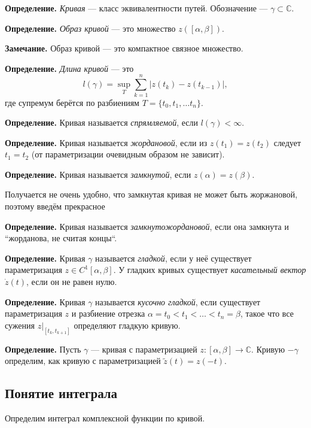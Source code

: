 \textbf{Определение.} \textit{Кривая} --- класс эквивалентности путей.
Обозначение --- $\gamma \subset \mathbb C$.

\textbf{Определение.} \textit{Образ кривой} --- это множество $z([\alpha, \beta])$.

\textbf{Замечание.} Образ кривой --- это компактное связное множество.

\textbf{Определение.} \textit{Длина кривой} --- это
\[
    l(\gamma) = \sup_T \sum_{k=1}^{n} |z(t_k) - z(t_{k-1})|,
\]
где супремум берётся по разбиениям $T = \{t_0, t_1, \dots t_n\}$.

\textbf{Определение.} Кривая называется \textit{спрямляемой}, если $l(\gamma) < \infty$.

\textbf{Определение.} Кривая называется \textit{жордановой}, если из $z(t_1) = z(t_2)$ следует $t_1 = t_2$ (от параметризации очевидным образом не зависит).

\textbf{Определение.} Кривая называется \textit{замкнутой}, если $z(\alpha) = z(\beta)$.

Получается не очень удобно, что замкнутая кривая не может быть жоржановой, поэтому введём прекрасное

\textbf{Определение.} Кривая называется \textit{замкнутожордановой}, если она замкнута и ``жорданова, не считая концы``.

\textbf{Определение.} Кривая $\gamma$ называется \textit{гладкой}, если у неё существует параметризация $z \in C^1[\alpha, \beta]$.
У гладких кривых существует \textit{касательный вектор} $\dot z(t)$, если он не равен нулю.

\textbf{Определение.} Кривая $\gamma$ называется \textit{кусочно гладкой}, если существует параметризация $z$ и разбиение отрезка $\alpha = t_0 < t_1 < \dots < t_n = \beta$, такое что все сужения $z|_{[t_k, t_{k+1}]}$ определяют гладкую кривую.

\textbf{Определение.} Пусть $\gamma$ --- кривая с параметризацией $z: [\alpha, \beta] \to \mathbb C$.
Кривую $-\gamma$ определим, как кривую с параметризацией $\tilde z(t) = z(-t)$.

\subsection{Понятие интеграла}
Определим интеграл комплексной функции по кривой.

